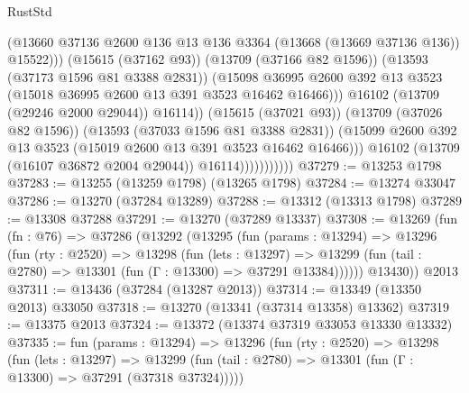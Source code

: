 \begin{lexlean}{RustStd}
\begin{coremodule}
                                      (@13660
                                        @37136
                                        @2600
                                        @136
                                        @13
                                        @136
                                        @3364
                                        (@13668 (@13669 @37136 @136))
                                        @15522)))
                                  (@15615 (@37162 @93))
                                  (@13709 (@37166 @82 @1596))
                                  (@13593 (@37173 @1596 @81 @3388 @2831))
                                  (@15098
                                    @36995
                                    @2600
                                    @392
                                    @13
                                    @3523
                                    (@15018 @36995 @2600 @13 @391 @3523 @16462 @16466)))
                                @16102
                                (@13709 (@29246 @2000 @29044))
                                @16114))
                            (@15615 (@37021 @93))
                            (@13709 (@37026 @82 @1596))
                            (@13593 (@37033 @1596 @81 @3388 @2831))
                            (@15099
                              @2600
                              @392
                              @13
                              @3523
                              (@15019 @2600 @13 @391 @3523 @16462 @16466)))
                          @16102
                          (@13709 (@16107 @36872 @2004 @29044))
                          @16114)))))))))))
@37279 := @13253 @1798
@37283 := @13255 (@13259 @1798) (@13265 @1798)
@37284 := @13274 @33047
@37286 := @13270 (@37284 @13289)
@37288 := @13312 (@13313 @1798)
@37289 := @13308 @37288
@37291 := @13270 (@37289 @13337)
@37308 := @13269
    (fun (fn : @76) =>
    @37286
      (@13292
        (@13295
          (fun (params : @13294) =>
          @13296
            (fun (rty : @2520) =>
            @13298
              (fun (lets : @13297) =>
              @13299 (fun (tail : @2780) => @13301 (fun (Γ : @13300) => @37291 @13384))))))
        @13430))
    @2013
@37311 := @13436 (@37284 (@13287 @2013))
@37314 := @13349 (@13350 @2013) @33050
@37318 := @13270 (@13341 (@37314 @13358) @13362)
@37319 := @13375 @2013
@37324 := @13372 (@13374 @37319 @33053 @13330 @13332)
@37335 := fun (params : @13294) =>
  @13296
    (fun (rty : @2520) =>
    @13298
      (fun (lets : @13297) =>
      @13299 (fun (tail : @2780) => @13301 (fun (Γ : @13300) => @37291 (@37318 @37324)))))

\end{coremodule}
\end{lexlean}
